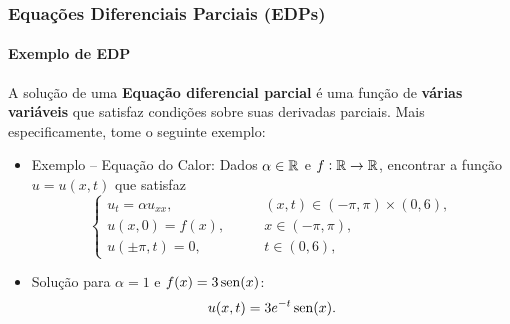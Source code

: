 \documentclass[usenames,dvipsnames,brazil,aspectratio=169]{beamer}
\begin{document}
\begin{frame}[t]
    \frametitle{Equações Diferenciais Parciais (EDPs)}
    \framesubtitle{Exemplo de EDP}
    
    A solução de uma \textbf{Equação diferencial parcial} é uma função de \textbf{várias variáveis} que satisfaz condições sobre suas derivadas parciais. Mais especificamente, tome o seguinte exemplo:
    \pula

    \pause

    \begin{itemize}
        \item<+-> Exemplo -- Equação do Calor: Dados $\alpha \in{\mathbb{R}}$ e $f:{\mathbb{R}}\to{\mathbb{R}}$, encontrar a função $u = u(x, t)$ que satisfaz
        \begin{equation*}
            \left\{
                \begin{array}{ll}
                    u_{t} =\alpha u_{xx}, &\quad \quad (x,t) \in (-\pi,\pi)\times(0,6), \\ 
                    u(x,0) = f(x), &\quad \quad x \in (-\pi,\pi),\\
                    u(\pm \pi,t) = 0, &\quad \quad t \in (0,6),
                \end{array}
            \right.
        \end{equation*}
        \item<+-> Solução para $\alpha = 1$ e $f(x) = 3\operatorname{sen}(x)$: 
            \begin{equation*}
                u(x, t) =  3e^{-t}\operatorname{sen}(x).
            \end{equation*}
    \end{itemize}
\end{frame}


    
\end{document}
